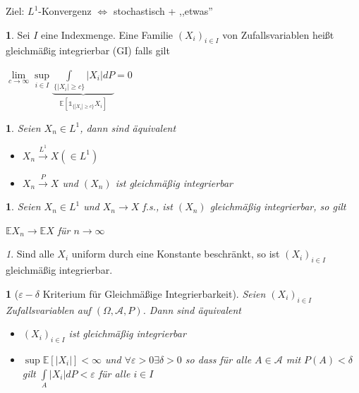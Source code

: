 \documentclass[10pt,a4paper]{report}
\newcommand{\E}{\mathbb{E}}
\numberwithin{equation}{section}
\numberwithin{figure}{section}
\theoremstyle{plain}
\theoremstyle{definition}
\newtheorem{defn}[thm]{\protect\definitionname}
\theoremstyle{remark}
\newtheorem{rem}[thm]{\protect\remarkname}
\theoremstyle{plain}
\newtheorem{prop}[thm]{\protect\propositionname}
\newtheorem{cor}[thm]{\protect\corollaryname}
\providecommand{\corollaryname}{Korollar}
\providecommand{\definitionname}{Definition}
\providecommand{\propositionname}{Satz}
\providecommand{\remarkname}{Bemerkung}
\newcommand{\1}{ \mathbb{1} } %
\begin{document}
Ziel: $L^1$-Konvergenz $\Leftrightarrow$ stochastisch + ,,etwas''
\begin{defn}  %
  Sei $I$ eine Indexmenge. Eine Familie $(X_i)_{i \in I}$ von Zufallsvariablen
  heißt gleichmäßig integrierbar (GI) falls gilt
  \begin{center}
    $\lim\limits_{c \to \infty} \sup\limits_{i \in I}
    \underbrace{\int\limits_{\{|X_i|\geq
        c\}}|X_i|dP}_{\E[\1_{\{|X_i|\geq c\}}X_i]}=0 $
  \end{center}
\end{defn}
\begin{prop}     %
  \label{prop:LkonvergenzUndPkonvergenz}
  Seien $X_n \in L^1$, dann sind äquivalent
  \begin{itemize}
  \item[i)] $X_n \overset{L^1}{\to} X (\in L^1)$
  \item[ii)] $X_n \overset{P}{\to} X$ und $(X_n)$ ist gleichmäßig integrierbar
  \end{itemize}
\end{prop}
\begin{cor}  %
  Seien $X_n \in L^1$ und $X_n \to X$ f.s., ist $(X_n)$ gleichmäßig integrierbar, so gilt
  \begin{center}
    $\E X_n \to \E X$ für $n \to \infty$
  \end{center}
\end{cor}
\begin{rem}
  Sind alle $X_i$ uniform durch eine Konstante beschränkt, so ist $(X_i)_{i \in I}$ gleichmäßig integrierbar.
\end{rem}
\begin{prop} [$\varepsilon - \delta$ Kriterium für Gleichmäßige Integrierbarkeit]
  Seien $(X_i)_{i \in I}$ Zufallsvariablen auf $(\Omega, \mathcal{A},P)$. Dann sind
  äquivalent
  \begin{itemize}
  \item[i)] $(X_i)_{i \in I}$ ist gleichmäßig integrierbar
  \item[ii)] $\sup \E [|X_i|]< \infty$ und $\forall \varepsilon > 0
    \exists \delta >0$ so dass für alle $A \in \mathcal{A}$ mit $P(A)<
    \delta$ gilt $\int\limits_A |X_i|dP<\varepsilon$ für alle $i \in I$
  \end{itemize}
\end{prop}
\end{document}
